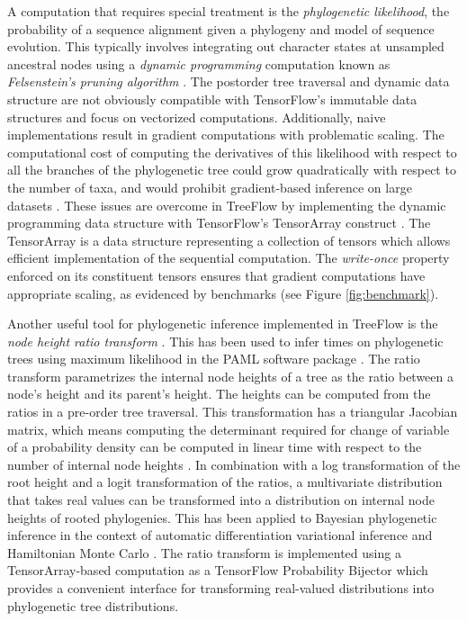 A computation that requires special treatment is the \textit{phylogenetic likelihood}, the probability of a sequence alignment given a phylogeny and model of sequence evolution. This typically involves integrating out character states at unsampled ancestral nodes using a \textit{dynamic programming} computation known as \textit{Felsenstein's pruning algorithm} \cite{felsenstein1981evolutionary}. The postorder tree traversal and dynamic data structure are not obviously compatible with TensorFlow's immutable data structures and focus on vectorized computations. Additionally, naive implementations result in gradient computations with problematic scaling. The computational cost of computing the derivatives of this likelihood with respect to all the branches of the phylogenetic tree could grow quadratically with respect to the number of taxa, and would prohibit gradient-based inference on large datasets \cite{ji2020gradients}. These issues are overcome in TreeFlow by implementing the dynamic programming data structure with TensorFlow's TensorArray construct \cite{yu2018dynamic}. The TensorArray is a data structure representing a collection of tensors which allows efficient implementation of the sequential computation. The \textit{write-once} property enforced on its constituent tensors ensures that gradient computations have appropriate scaling, as evidenced by benchmarks (see Figure \ref{fig:benchmark}).

Another useful tool for phylogenetic inference implemented in TreeFlow is the \textit{node height ratio transform} \cite{kishino2001performance}. This has been used to infer times on phylogenetic trees using maximum likelihood in the PAML software package \cite{yang2007paml}. The ratio transform parametrizes the internal node heights of a tree as the ratio between a node's height and its parent's height. The heights can be computed from the ratios in a pre-order tree traversal. This transformation has a triangular Jacobian matrix, which means computing the determinant required for change of variable of a probability density can be computed in linear time with respect to the number of internal node heights \cite{fourment2019evaluating}. In combination with a log transformation of the root height and a logit transformation of the ratios, a multivariate distribution that takes real values can be transformed into a distribution on internal node heights of rooted phylogenies. This has been applied to Bayesian phylogenetic inference in the context of automatic differentiation variational inference \cite{fourment2019evaluating} and Hamiltonian Monte Carlo \cite{ji2021scalable}. The ratio transform is implemented using a TensorArray-based computation as a TensorFlow Probability Bijector which provides a convenient interface for transforming real-valued distributions into phylogenetic tree distributions.

